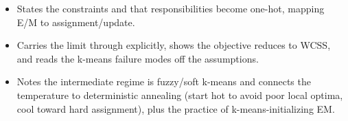 \begin{interviewq}

\goodgreat
\begin{itemize}
    \item {} States the constraints and that responsibilities become one-hot, mapping E/M to assignment/update.
    \item {} Carries the limit through explicitly, shows the objective reduces to WCSS, and reads the k-means failure modes off the assumptions.
    \item {} Notes the intermediate regime is fuzzy/soft k-means and connects the temperature to deterministic annealing (start hot to avoid poor local optima, cool toward hard assignment), plus the practice of k-means-initializing EM.
\end{itemize}

\end{interviewq}

